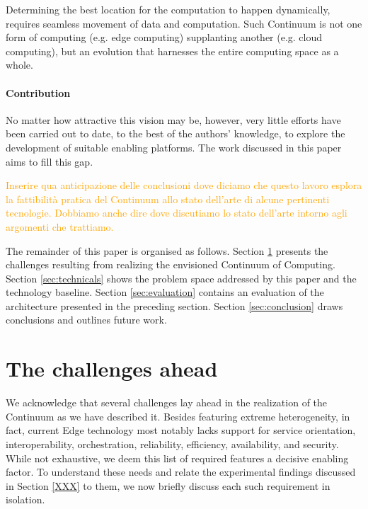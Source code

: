 
Determining the best location for the computation to happen dynamically, requires seamless movement of data and computation. Such Continuum is not one form of computing (e.g. edge computing) supplanting another (e.g. cloud computing), but an evolution that harnesses the entire computing space as a whole.

\paragraph{Contribution}
No matter how attractive this vision may be, however, very little efforts have been carried out to date, to the best of the authors' knowledge, to explore the development of suitable enabling platforms. The work discussed in this paper aims to fill this gap. 

\textcolor{orange}{Inserire qua anticipazione delle conclusioni dove diciamo che questo lavoro esplora la fattibilità pratica del Continuum allo stato dell'arte di alcune pertinenti tecnologie.
Dobbiamo anche dire dove discutiamo lo stato dell'arte intorno agli argomenti che trattiamo.}

The remainder of this paper is organised as follows. Section \ref{sec:challenges} presents the challenges resulting from realizing the envisioned Continuum of Computing. 
Section \ref{sec:technicals} shows the problem space addressed by this paper and the technology baseline. 
Section \ref{sec:evaluation} contains an evaluation of the architecture presented in the preceding section.
Section \ref{sec:conclusion} draws conclusions and outlines future work.

\section{The challenges ahead}
\label{sec:challenges}

We acknowledge that several challenges lay ahead in the realization of the Continuum as we have described it. 
Besides featuring extreme heterogeneity, in fact, current Edge technology most notably lacks support for service orientation, interoperability, orchestration, reliability, efficiency, availability, and security.
While not exhaustive, we deem this list of required features a decisive enabling factor.
To understand these needs and relate the experimental findings discussed in Section \ref{XXX} to them, we now briefly discuss each such requirement in isolation. 

